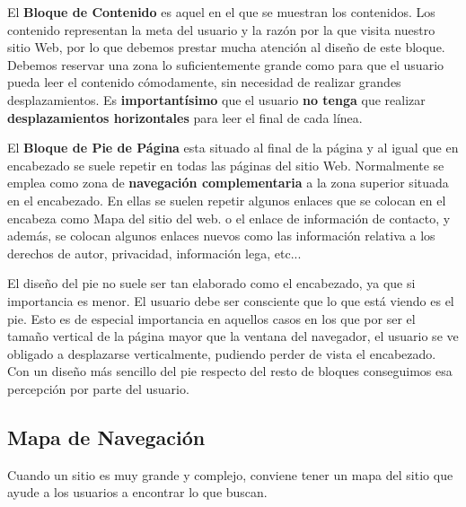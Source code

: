 El \textbf{Bloque de Contenido} es aquel en el que se muestran los contenidos. Los contenido representan la meta del usuario y la razón por la que visita nuestro sitio Web, por lo que debemos prestar mucha atención al diseño de este bloque. Debemos reservar una zona lo suficientemente grande como para que el usuario pueda leer el contenido cómodamente, sin necesidad de realizar grandes desplazamientos. Es \textbf{importantísimo} que el usuario \textbf{no tenga} que realizar \textbf{desplazamientos horizontales} para leer el final de cada línea.

El \textbf{Bloque de Pie de Página} esta situado al final de la página y al igual que en encabezado se suele repetir en todas las páginas del sitio Web. Normalmente se emplea como zona de \textbf{navegación complementaria} a la zona superior situada en el encabezado. En ellas se suelen repetir algunos enlaces que se colocan en el encabeza como Mapa del sitio del web. o el enlace de información de contacto, y además, se colocan algunos enlaces nuevos como las información relativa a los derechos de autor, privacidad, información lega, etc...

El diseño del pie no suele ser tan elaborado como el encabezado, ya que si importancia es menor. El usuario debe ser consciente que lo que está viendo es el pie. Esto es de especial importancia en aquellos casos en los que por ser el tamaño vertical de la página mayor que la ventana del navegador, el usuario se ve obligado a desplazarse verticalmente, pudiendo perder de vista el encabezado. Con un diseño más sencillo del pie respecto del resto de bloques conseguimos esa percepción por parte del usuario.

\subsection{Mapa de Navegación}
Cuando un sitio es muy grande y complejo, conviene tener un mapa del sitio que ayude a los usuarios a encontrar lo que buscan.




